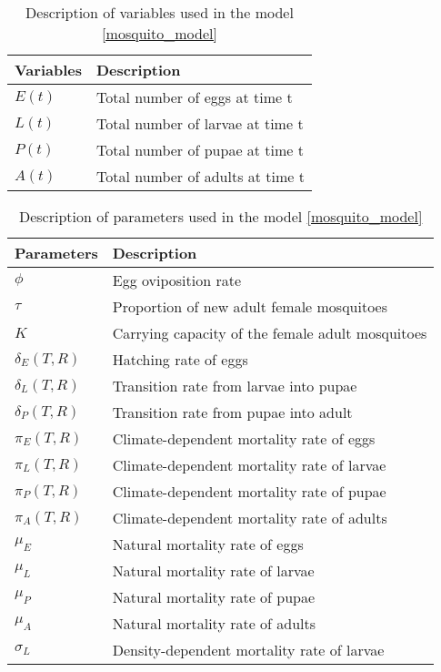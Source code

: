 \documentclass[12pt,a4paper,titlepage]{article}
\begin{document}
\begin{table}[h!]
	\begin{center}
		\caption{Description of variables used in the model \ref{mosquito_model}}
		\label{tab:table1}
		\begin{tabular}{l|l} %
			\hline
			\textbf{Variables} & \textbf{Description} \\
			\hline
			$E(t)$ & Total number of eggs at  time t \\
			$L(t)$ & Total number of larvae at  time t \\
			$P(t)$ & Total number of pupae at  time t \\
			$A(t)$ & Total number of adults at  time t
			
		\end{tabular}
	\end{center}
\end{table}

\begin{table}[h!]
	\begin{center}
		\caption{Description of parameters used in the model \ref{mosquito_model}}
		\label{tab:table2}
		\begin{tabular}{l|l} %
			\hline
			\textbf{Parameters} & \textbf{Description} \\
			\hline
			$\phi$ & Egg oviposition rate \\
			$\tau$ & Proportion of new adult female mosquitoes \\
			$K$ & Carrying capacity of the female adult mosquitoes \\
			$\delta_E(T, R)$ & Hatching rate of eggs \\
			$\delta_L(T, R)$ & Transition rate from larvae into pupae\\
			$\delta_P(T,R)$ & Transition rate from pupae into adult\\
			$\pi_E(T, R)$ & Climate-dependent mortality rate of eggs\\
			$\pi_L(T, R)$ & Climate-dependent mortality rate of larvae\\
			$\pi_P(T, R)$ & Climate-dependent mortality rate of pupae\\
			$\pi_A(T, R)$ & Climate-dependent mortality rate of adults\\
			$\mu_E$ & Natural mortality rate of eggs\\
			$\mu_L$ & Natural mortality rate of larvae\\
			$\mu_P$ & Natural mortality rate of pupae\\
			$\mu_A$ & Natural mortality rate of adults\\
			$\sigma_L$ & Density-dependent mortality rate of larvae\\
		\end{tabular}
	\end{center}
\end{table}
\end{document}
